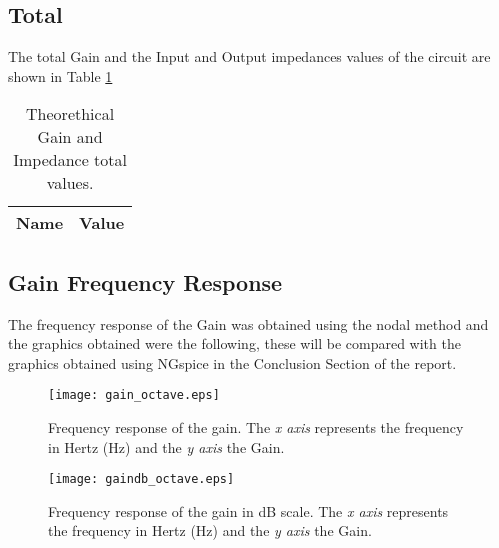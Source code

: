 \subsection{Total}

The total Gain and the Input and Output impedances values of the circuit are shown in Table \ref{tab:teo_total}

\begin{table}[H]
	\centering
	\begin{tabular}{|l|r|}
		\hline    
		{\bf Name} & {\bf Value} \\ \hline
		
	\end{tabular}
	\caption{Theorethical Gain and Impedance total values.}
	\label{tab:teo_total}
\end{table}

\subsection{Gain Frequency Response}

The frequency response of the Gain was obtained using the nodal method and the graphics obtained were the following, these will be compared with the graphics obtained using NGspice in the Conclusion Section of the report.

\begin{figure}[H] \centering
	\texttt{[image: gain\_octave.eps]}
	\caption{Frequency response of the gain. The \textit{x axis} represents the frequency in Hertz (Hz) and the \textit{y axis} the Gain.}
	\label{fig:teo_gain}
\end{figure}

\begin{figure}[H] \centering
	\texttt{[image: gaindb\_octave.eps]}
	\caption {Frequency response of the gain in dB scale. The \textit{x axis} represents the frequency in Hertz (Hz) and the \textit{y axis} the Gain.}
	\label{fig:teo_gaindB}
\end{figure}
